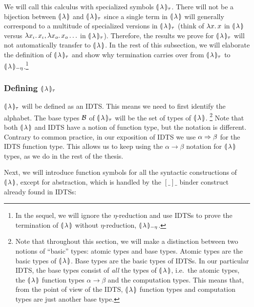 We will call this calculus with specialized symbols
$\llparenthesis \, \lambda \, \rrparenthesis_\tau$. There will not be a bijection between
$\llparenthesis \, \lambda \, \rrparenthesis$ and $\llparenthesis \, \lambda \, \rrparenthesis_\tau$ since a single term in
$\llparenthesis \, \lambda \, \rrparenthesis$ will generally correspond to a multitude of specialized
versions in $\llparenthesis \, \lambda \, \rrparenthesis_\tau$ (think of $\lambda x.\, x$ in
$\llparenthesis \, \lambda \, \rrparenthesis$ versus $\lambda x_\iota.\, x_\iota, \lambda x_o.\, x_o \ldots$
in $\llparenthesis \, \lambda \, \rrparenthesis_\tau$). Therefore, the results we prove for
$\llparenthesis \, \lambda \, \rrparenthesis_\tau$ will not automatically transfer to
$\llparenthesis \, \lambda \, \rrparenthesis$. In the rest of this subsection, we will elaborate the
definition of $\llparenthesis \, \lambda \, \rrparenthesis_\tau$ and show why termination carries over
from $\llparenthesis \, \lambda \, \rrparenthesis_\tau$ to $\llparenthesis \, \lambda \, \rrparenthesis_{-\eta}$.\footnote{In the
  sequel, we will ignore the $\eta$-reduction and use IDTSs to prove the
  termination of $\llparenthesis \, \lambda \, \rrparenthesis$ without $\eta$-reduction,
  $\llparenthesis \, \lambda \, \rrparenthesis_{-\eta}$.}


\subsubsection{Defining $\llparenthesis \, \lambda \, \rrparenthesis_\tau$}
\label{sssec:banana-tau}

$\llparenthesis \, \lambda \, \rrparenthesis_\tau$ will be defined as an IDTS. This means we need to
first identify the alphabet. The base types $\mathcal{B}$ of
$\llparenthesis \, \lambda \, \rrparenthesis_\tau$ will be the set of types of $\llparenthesis \, \lambda \, \rrparenthesis$.
\footnote{Note that throughout this section, we will make a distinction
  between two notions of ``basic'' types: atomic types and base
  types. Atomic types are the basic types of ${\llparenthesis \, \lambda \, \rrparenthesis}$. Base types are the
  basic types of IDTSs. In our particular IDTS, the base types consist of
  \emph{all} the types of ${\llparenthesis \, \lambda \, \rrparenthesis}$, i.e.\ the atomic types, the ${\llparenthesis \, \lambda \, \rrparenthesis}$
  function types $\alpha \to \beta$ and the computation types. This means
  that, from the point of view of the IDTS, ${\llparenthesis \, \lambda \, \rrparenthesis}$ function types and
  computation types are just another base type.}  Note that both
$\llparenthesis \, \lambda \, \rrparenthesis$ and IDTS have a notion of function type, but the
notation is different. Contrary to common practice, in our exposition of
IDTS we use $\alpha \Rightarrow \beta$ for the IDTS function type. This allows us
to keep using the $\alpha \to \beta$ notation for $\llparenthesis \, \lambda \, \rrparenthesis$ types,
as we do in the rest of the thesis.

Next, we will introduce function symbols for all the syntactic
constructions of $\llparenthesis \, \lambda \, \rrparenthesis$, except for abstraction, which is
handled by the $[\_]\_$ binder construct already found in IDTSs:


